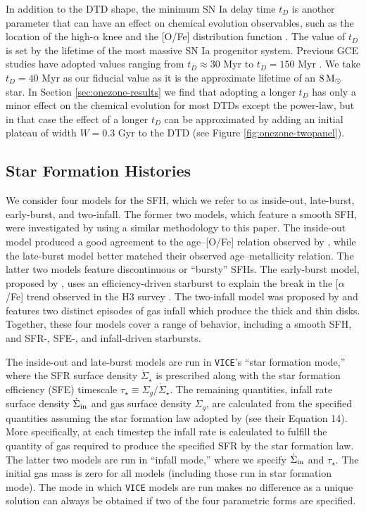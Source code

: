 \documentclass[twocolumn,twocolappendix]{aastex631}
\newcommand{\aFe}{[$\alpha$/Fe]\xspace}
\newcommand{\vice}{{\tt VICE}\xspace}
\begin{document}
In addition to the DTD shape, the minimum SN Ia delay time $t_D$ is another parameter that can have an effect on chemical evolution observables, such as the location of the high-$\alpha$ knee and the [O/Fe] distribution function \citep[DF;][]{Andrews2017-ChemicalEvolution}. The value of $t_D$ is set by the lifetime of the most massive SN Ia progenitor system. Previous GCE studies have adopted values ranging from $t_D\approx30$ Myr \citep[e.g.,][]{Poulhazan2018-PrecisionPollution} to $t_D=150$ Myr . We take $t_D=40$ Myr as our fiducial value as it is the approximate lifetime of an $8\,{\rm M}_\odot$ star. In Section \ref{sec:onezone-results} we find that adopting a longer $t_D$ has only a minor effect on the chemical evolution for most DTDs except the power-law, but in that case the effect of a longer $t_D$ can be approximated by adding an initial plateau of width $W=0.3$ Gyr to the DTD (see Figure \ref{fig:onezone-twopanel}).

\subsection{Star Formation Histories}
\label{sec:sfh}

We consider four models for the SFH, which we refer to as inside-out, late-burst, early-burst, and two-infall. 
The former two models, which feature a smooth SFH, were investigated by  using a similar methodology to this paper. The inside-out model produced a good agreement to the age--[O/Fe] relation observed by \citet{Feuillet2019-MilkyWayAges}, while the late-burst model better matched their observed age--metallicity relation. The latter two models feature discontinuous or ``bursty'' SFHs. The early-burst model, proposed by \citet{Conroy2022-ThickDisk}, uses an efficiency-driven starburst to explain the break in the \aFe trend observed in the H3 survey \citep{Conroy2019-H3Survey}. The two-infall model was proposed by \citet{Chiappini1997-TwoInfall} and features two distinct episodes of gas infall which produce the thick and thin disks.
Together, these four models cover a range of behavior, including a smooth SFH, and SFR-, SFE-, and infall-driven starbursts.

The inside-out and late-burst models are run in \vice's ``star formation mode,'' where the SFR surface density $\dot\Sigma_\star$ is prescribed along with the star formation efficiency (SFE) timescale $\tau_\star\equiv \Sigma_g/\dot\Sigma_\star$. The remaining quantities, infall rate surface density $\dot\Sigma_{\rm in}$ and gas surface density $\Sigma_g$, are calculated from the specified quantities assuming the star formation law adopted by  (see their Equation 14). More specifically, at each timestep the infall rate is calculated to fulfill the quantity of gas required to produce the specified SFR by the star formation law. The latter two models are run in ``infall mode,'' where we specify $\dot\Sigma_{\rm in}$ and $\tau_\star$. The initial gas mass is zero for all models (including those run in star formation mode). The mode in which \vice models are run makes no difference as a unique solution can always be obtained if two of the four parametric forms are specified. 
\end{document}
